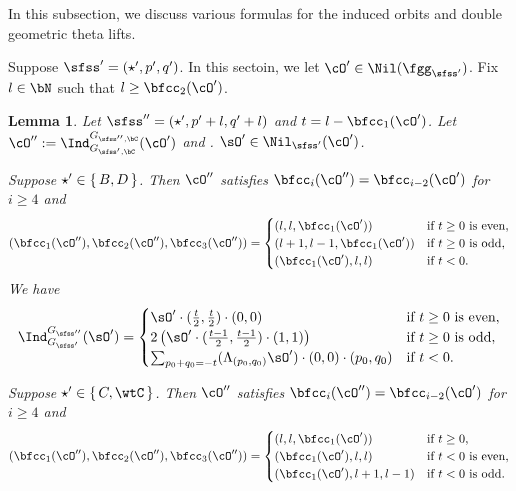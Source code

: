 \documentclass[12pt,a4paper]{amsart}
\def\abs#1{\left|{#1}\right|}
\numberwithin{equation}{section}
\newtheorem{lem}[thm]{Lemma}
\theoremstyle{remark}
\def\cOp{\cO^{\prime}}
\def\cOpp{\cO^{\prime\prime}}
\begin{document}
\def\indsss{\Ind_{G_{\sfss'}}^{G_{\sfss''}}}
\def\indss{\Ind_{G_{\sfss',\bC}}^{G_{\sfss'',\bC}}}

In this subsection, we discuss various formulas for the induced orbits and double
geometric theta lifts. 

Suppose $\sfss' = (\star',p',q')$. In this sectoin, we let $\cOp\in\Nil(\fggsp)$.
Fix $l\in \bN$ such that $l\geq \bfcc_2(\cOp)$. 


\begin{lem}\label{lem:ind}
Let $\sfss'' =(\star',p'+l,q'+l)$ and $t = l-\bfcc_1(\cOp)$.
Let $\cOpp:=\indss(\cOp)$ and . %
    $\sOp\in \Nil_{\sfss'}(\cOp)$.
  \begin{enuma}
    \item Suppose $\star'\in \set{B,D}$.
    Then $\cOpp$ satisfies 
    $\bfcc_i(\cOpp)=\bfcc_{i-2}(\cOp)$ for $i\geq 4$ and
    \[
      (\bfcc_1(\cOpp), \bfcc_2(\cOpp),\bfcc_3(\cOpp))
      =\begin{cases}
        (l,l,\bfcc_1(\cOp))     & \text{if $t\geq 0$ is even}, \\
        (l+1,l-1,\bfcc_1(\cOp)) & \text{if $t\geq 0$ is odd},  \\
        (\bfcc_1(\cOp),l,l)     & \text{if $t<0$}.             \\
      \end{cases}
    \]
    We have
    \[
      \indsss(\sOp) =
      \begin{cases}
        \sOp\cdot (\frac{t}{2},\frac{t}{2})\cdot (0,0)
         & \text{if $t \geq 0$ is even}, \\
        2  \left(\sOp\cdot (\frac{t-1}{2},\frac{t-1}{2})\cdot (1,1) \right)
         & \text{if $t\geq 0$ is odd},   \\
        \sum_{p_0+q_0=-t}
        (\Lambda_{(p_0,q_0)}\sOp)\cdot (0,0)\cdot (p_0,q_0)
         & \text{if $t<0$}.              \\
      \end{cases}
    \]
    \item Suppose $\star'\in \set{C,\wtC}$.
    Then $\cOpp$ satisfies
    $\bfcc_i(\cOpp)=\bfcc_{i-2}(\cOp)$ for $i\geq 4$ and
    \[
      (\bfcc_1(\cOpp), \bfcc_2(\cOpp),\bfcc_3(\cOpp))
      =\begin{cases}
        (l,l,\bfcc_1(\cOp))     & \text{if $t\geq 0$}, \\
        (\bfcc_1(\cOp),l,l) & \text{if $t < 0$ is even},  \\
        (\bfcc_1(\cOp),l+1,l-1)     & \text{if $t<0$ is odd}.             \\
      \end{cases}
    \]


\end{enuma}
\end{lem}
\end{document}
